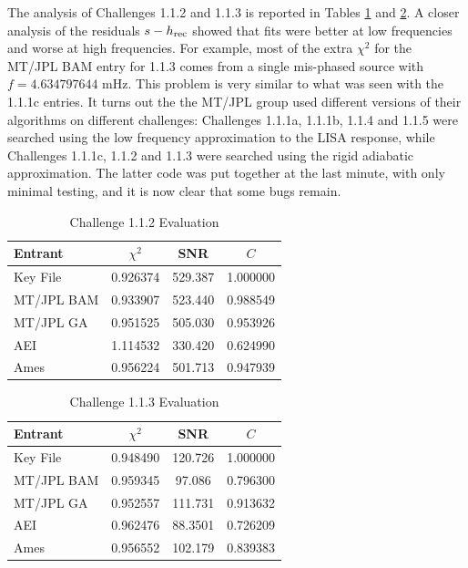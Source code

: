 \documentclass[11pt]{article}
\begin{document}
The analysis of Challenges 1.1.2 and 1.1.3 is reported in Tables \ref{Challenge1.1.2} and \ref{Challenge1.1.3}.
A closer analysis of the residuals $s-h_{\rm rec}$ showed that fits were better at low frequencies and worse
at high frequencies. For example, most of the extra $\chi^2$ for the MT/JPL BAM entry for 1.1.3 comes from a
single mis-phased source with $f=4.634797644$ mHz. This problem is very similar to what was seen with the
1.1.1c entries. It turns out the the MT/JPL group used different versions of their algorithms on different
challenges: Challenges 1.1.1a, 1.1.1b, 1.1.4 and 1.1.5 were searched using the low frequency approximation
to the LISA response, while Challenges 1.1.1c, 1.1.2 and 1.1.3 were searched using the rigid adiabatic approximation.
The latter code was put together at the last minute, with only minimal testing, and it is now clear that some
bugs remain.

\begin{table}[t]
\caption{\label{Challenge1.1.2}Challenge 1.1.2 Evaluation}
\begin{center}
\begin{tabular}{|l|c|c|c|}
\hline
Entrant  & $\chi^2$ & SNR & $C$ \\
 \hline
Key File   & 0.926374 & 529.387 & 1.000000 \\
MT/JPL BAM & 0.933907 & 523.440 & 0.988549 \\
MT/JPL GA  & 0.951525 & 505.030 & 0.953926 \\
AEI        & 1.114532 & 330.420 & 0.624990 \\
Ames       & 0.956224 & 501.713 & 0.947939 \\
\hline  
\end{tabular}
\end{center}
\end{table}

\begin{table}[t]
\caption{\label{Challenge1.1.3}Challenge 1.1.3 Evaluation}
\begin{center}
\begin{tabular}{|l|c|c|c|}
\hline
Entrant  & $\chi^2$ & SNR & $C$ \\
 \hline
Key File   & 0.948490 & 120.726 & 1.000000 \\
MT/JPL BAM & 0.959345 & 97.086 & 0.796300 \\
MT/JPL GA  & 0.952557 & 111.731 & 0.913632 \\
AEI        & 0.962476 & 88.3501 & 0.726209 \\
Ames       & 0.956552 & 102.179 & 0.839383 \\
\hline  
\end{tabular}
\end{center}
\end{table}
\end{document}
